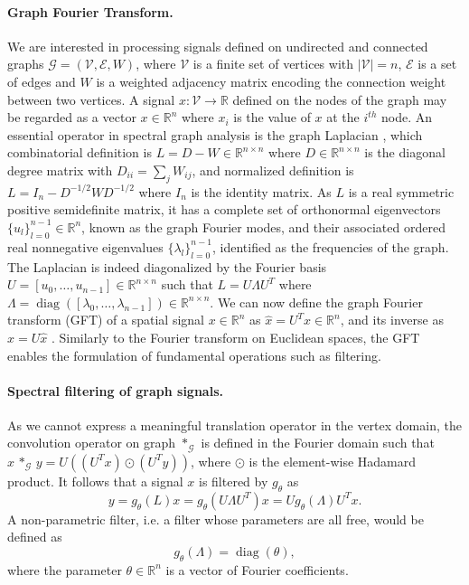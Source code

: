 \documentclass{article}
\DeclareMathOperator*{\diag}{diag}
\newcommand{\G}{\mathcal{G}}
\newcommand{\V}{\mathcal{V}}
\newcommand{\E}{\mathcal{E}}
\newcommand{\R}{\mathbb{R}}
\begin{document}
\paragraph{Graph Fourier Transform.} We are interested in processing signals
defined on undirected and connected graphs $\G=(\V,\E,W)$, where $\V$ is a
finite set of vertices with $|\V|=n$, $\E$ is a set of edges and $W$ is a
weighted adjacency matrix encoding the connection weight between two vertices. A
signal $x: \V \rightarrow \R$ defined on the nodes of the graph may be regarded
as a vector $x \in \R^n$ where $x_i$ is the value of $x$ at the $i^{th}$ node.
An essential operator in spectral graph analysis is the graph Laplacian
\cite{book:Chung97Spectral}, which combinatorial definition is $L = D - W \in
\R^{n \times n}$ where $D \in \R^{n \times n}$ is the diagonal degree matrix
with $D_{ii} = \sum_j W_{ij}$, and normalized definition is $L = I_n -
D^{-1/2} W D^{-1/2}$ where $I_n$ is the identity matrix. As $L$ is a real
symmetric positive semidefinite matrix, it has a complete set of orthonormal
eigenvectors $\{u_l\}_{l=0}^{n-1} \in \R^n$, known as the graph Fourier modes,
and their associated ordered real nonnegative eigenvalues
$\{\lambda_l\}_{l=0}^{n-1}$, identified as the frequencies of the graph. The
Laplacian is indeed diagonalized by the Fourier basis $U=[u_0, \ldots, u_{n-1}]
\in \R^{n \times n}$ such that $L = U \Lambda U^T$ where $\Lambda =
\diag([\lambda_0, \ldots, \lambda_{n-1}]) \in \R^{n \times n}$. We can now
define the graph Fourier transform (GFT) of a spatial signal $x \in \R^n$ as
$\hat{x} = U^T x \in \R^n$, and its inverse as $x = U \hat{x}$
\cite{art:ShumanNarangFrossardOrtegaVandergheynst13ReviewSPG}. Similarly to the
Fourier transform on Euclidean spaces, the GFT enables the formulation of
fundamental operations such as filtering.

\paragraph{Spectral filtering of graph signals.} As we cannot express a
meaningful translation operator in the vertex domain, the convolution operator
on graph $\ast_\G$ is defined in the Fourier domain such that $x \,\ast_\G\, y =
U((U^Tx) \odot (U^Ty))$, where $\odot$ is the element-wise Hadamard product. It
follows that a signal $x$ is filtered by $g_\theta$ as
\begin{equation}
	y = g_\theta(L) x = g_\theta(U \Lambda U^T) x = U g_\theta(\Lambda) U^T x.
\end{equation}
A non-parametric filter, i.e. a filter whose parameters
are all free, would be defined as
\begin{equation} \label{eq:filt_non-param}
	g_\theta(\Lambda) = \diag(\theta),
\end{equation}
where the parameter $\theta \in \R^n$ is a vector of Fourier coefficients.
\end{document}
